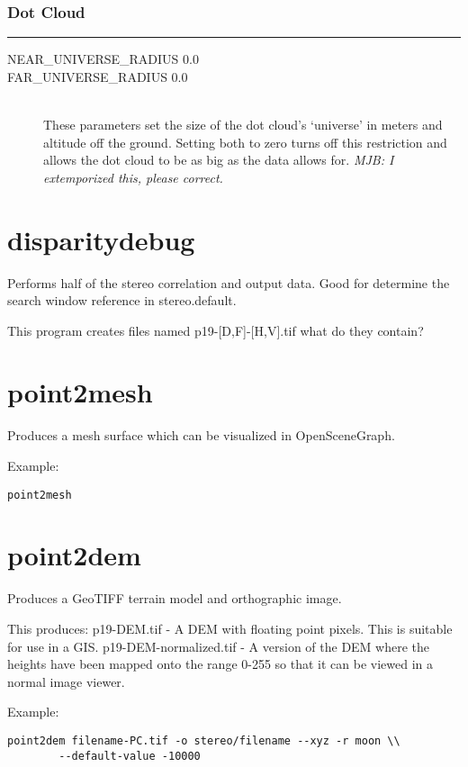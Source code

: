 \subsubsection*{Dot Cloud}
\hrule
\bigskip

\begin{description}
\item[NEAR\_UNIVERSE\_RADIUS 0.0]
\item[FAR\_UNIVERSE\_RADIUS 0.0] \hfill \\
These parameters set the size of the dot cloud's `universe' in meters and altitude off the ground.  Setting both to zero turns off this restriction and allows the dot cloud to be as big as the data allows for. \emph{MJB: I extemporized this, please correct.}

\end{description}

\section{disparitydebug}
\label{disparitydebug}

Performs half of the stereo correlation and output data. Good for
determine the search window reference in stereo.default.

This program creates files named p19-[D,F]-[H,V].tif what do they contain?

\section{point2mesh}
\label{point2mesh}

Produces a mesh surface which can be visualized in OpenSceneGraph.

Example:
\begin{verbatim}
point2mesh
\end{verbatim}

\section{point2dem}
\label{point2dem}

Produces a GeoTIFF terrain model and orthographic image.

This produces: 
	p19-DEM.tif - A DEM with floating point pixels. This is suitable for use in a GIS.
	p19-DEM-normalized.tif - A version of the DEM where the heights have been mapped onto the range 0-255 so that it can be viewed in a normal image viewer.

Example:
\begin{verbatim}
point2dem filename-PC.tif -o stereo/filename --xyz -r moon \\
        --default-value -10000
\end{verbatim}


